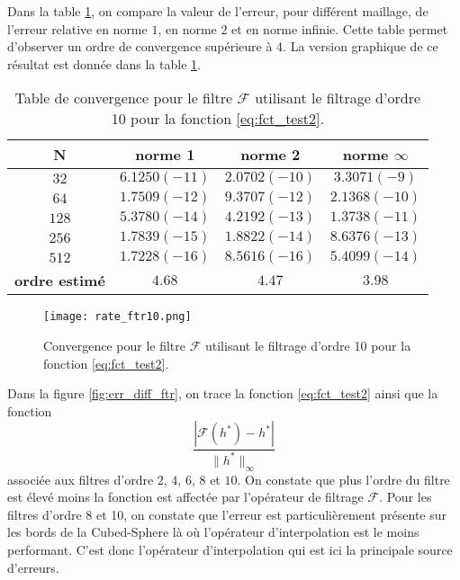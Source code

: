 Dans la table \ref{tab:rate_ftr10}, on compare la valeur de l'erreur, pour différent maillage, de l'erreur relative en norme $1$, en norme $2$ et en norme infinie. Cette table permet d'observer un ordre de convergence supérieure à 4. La version graphique de ce résultat est donnée dans la table \ref{fig:rate_ftr10}.

\begin{table}[htbp]
\begin{center}
\begin{tabular}{|c||c|c|c|}
\hline
\textbf{N}  & \textbf{norme 1} & \textbf{norme 2} & \textbf{norme $\infty$} \\
\hline
\hline
$32$ & $6.1250(-11)$  & $2.0702(-10)$  & $3.3071(-9)$  \\
$64$ & $1.7509(-12)$  & $9.3707(-12)$  & $2.1368(-10)$  \\
$128$& $5.3780(-14)$  & $4.2192(-13)$  & $1.3738(-11)$  \\
$256$& $1.7839(-15)$  & $1.8822(-14)$  & $8.6376(-13)$  \\
$512$& $1.7228(-16)$  & $8.5616(-16)$  & $5.4099(-14)$  \\
\hline
\hline
\textbf{ordre estimé}& $4.68$ & $4.47$ & $3.98$\\
\hline
\end{tabular}
\end{center}
\caption{Table de convergence pour le filtre $\mathcal{F}$ utilisant le filtrage d'ordre 10 pour la fonction \eqref{eq:fct_test2}.}
\label{tab:rate_ftr10}
\end{table} 

\begin{figure}[htbp]
\begin{center}
\texttt{[image: rate\_ftr10.png]}
\end{center}
\caption{Convergence pour le filtre $\mathcal{F}$ utilisant le filtrage d'ordre 10 pour la fonction \eqref{eq:fct_test2}.}
\label{fig:rate_ftr10}
\end{figure}

Dans la figure \ref{fig:err_diff_ftr}, on trace la fonction \eqref{eq:fct_test2} ainsi que la fonction
\begin{equation}
\dfrac{|\mathcal{F}(h^*) - h^*|}{\| h^* \|_{\infty}}
\label{eq:ftr_err}
\end{equation}
associée aux filtres d'ordre $2$, $4$, $6$, $8$ et $10$. On constate que plus l'ordre du filtre est élevé moins la fonction est affectée par l'opérateur de filtrage $\mathcal{F}$. Pour les filtres d'ordre 8 et 10, on constate que l'erreur est particulièrement présente sur les bords de la Cubed-Sphere là où l'opérateur d'interpolation est le moins performant. C'est donc l'opérateur d'interpolation qui est ici la principale source d'erreurs.

